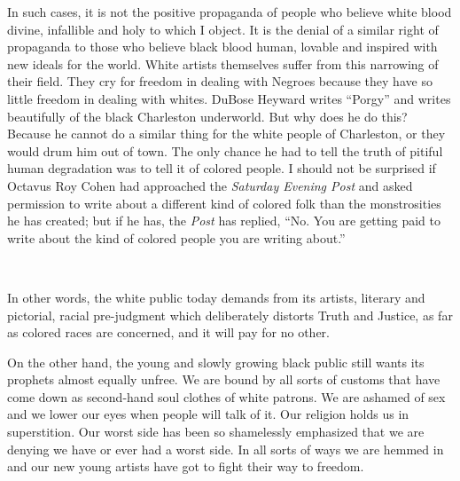 \documentclass[12pt]{article}
\begin{document}
{\duboispara}%
In such cases, it is not the positive propaganda of people who believe white blood divine, infallible and holy to which I object. It is the denial of a similar right of propaganda to those who believe black blood human, lovable and inspired with new ideals for the world. White artists themselves suffer from this narrowing of their field. They cry for freedom in dealing with Negroes because they have so little freedom in dealing with whites. DuBose Heyward writes ``Porgy'' and writes beautifully of the black Charleston underworld. But why does he do this? Because he cannot do a similar thing for the white people of Charleston, or they would drum him out of town. The only chance he had to tell the truth of pitiful human degradation was to tell it of colored people. I should not be surprised if Octavus Roy Cohen had approached the \emph{Saturday Evening Post} and asked permission to write about a different kind of colored folk than the monstrosities he has created; but if he has, the \emph{Post} has replied, ``No. You are getting paid to write about the kind of colored people you are writing about.''


~%

{\duboispara}%
In other words, the white public today demands from its artists, literary and pictorial, racial pre-judgment which deliberately distorts Truth and Justice, as far as colored races are concerned, and it will pay for no other. 

{\duboispara}%
On the other hand, the young and slowly growing black public still wants its prophets almost equally unfree. We are bound by all sorts of customs that have come down as second-hand soul clothes of white patrons. We are ashamed of sex and we lower our eyes when people will talk of it. Our religion holds us in superstition. Our worst side has been so shamelessly emphasized that we are denying we have or ever had a worst side. In all sorts of ways we are hemmed in and our new young artists have got to fight their way to freedom. 
\end{document}
